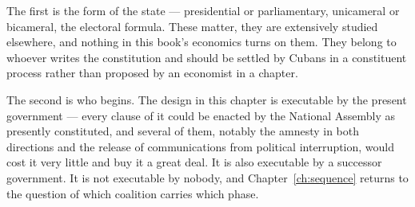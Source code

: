 The first is the form of the state --- presidential or parliamentary, unicameral
or bicameral, the electoral formula. These matter, they are extensively studied
elsewhere, and nothing in this book's economics turns on them. They belong to
whoever writes the constitution and should be settled by Cubans in a
constituent process rather than proposed by an economist in a chapter.

The second is who begins. The design in this chapter is executable by the
present government --- every clause of it could be enacted by the National
Assembly as presently constituted, and several of them, notably the amnesty in
both directions and the release of communications from political interruption,
would cost it very little and buy it a great deal. It is also executable by a
successor government. It is not executable by nobody, and
Chapter~\ref{ch:sequence} returns to the question of which coalition carries
which phase.
